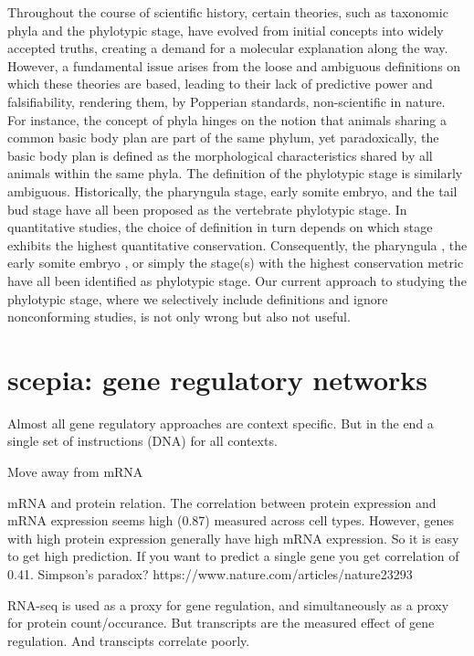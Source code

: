 Throughout the course of scientific history, certain theories, such as taxonomic phyla and the phylotypic stage, have evolved from initial concepts into widely accepted truths, creating a demand for a molecular explanation along the way. However, a fundamental issue arises from the loose and ambiguous definitions on which these theories are based, leading to their lack of predictive power and falsifiability, rendering them, by Popperian standards, non-scientific in nature. For instance, the concept of phyla hinges on the notion that animals sharing a common basic body plan are part of the same phylum, yet paradoxically, the basic body plan is defined as the morphological characteristics shared by all animals within the same phyla\cite{BUDD2000}. The definition of the phylotypic stage is similarly ambiguous. Historically, the pharyngula stage\cite{https://doi.org/10.1093/icb/21.2.391}, early somite embryo\cite{ https://doi.org/10.1046/j.1420-9101.1993.6030457.x}, and the tail bud stage \cite{Slack1993} have all been proposed as the vertebrate phylotypic stage. In quantitative studies, the choice of definition in turn depends on which stage exhibits the highest quantitative conservation. Consequently, the pharyngula \cite{Irie2011,marletaz2018}, the early somite embryo \cite{DomazetLoso2010}, or simply the stage(s) with the highest conservation metric\cite{Kalinka2010,Cordero2020} have all been identified as phylotypic stage. Our current approach to studying the phylotypic stage, where we selectively include definitions and ignore nonconforming studies, is not only wrong but also not useful.

\section{scepia: gene regulatory networks}

Almost all gene regulatory approaches are context specific. But in the end a single set of instructions (DNA) for all contexts.

Move away from mRNA

mRNA and protein relation.
The correlation between protein expression and mRNA expression seems high (0.87) measured across cell types. However, genes with high protein expression generally have high mRNA expression. So it is easy to get high prediction. If you want to predict a single gene you get correlation of 0.41. Simpson's paradox?
https://www.nature.com/articles/nature23293

RNA-seq is used as a proxy for gene regulation, and simultaneously as a proxy for protein count/occurance. But transcripts are the measured effect of gene regulation. And transcipts correlate poorly.


